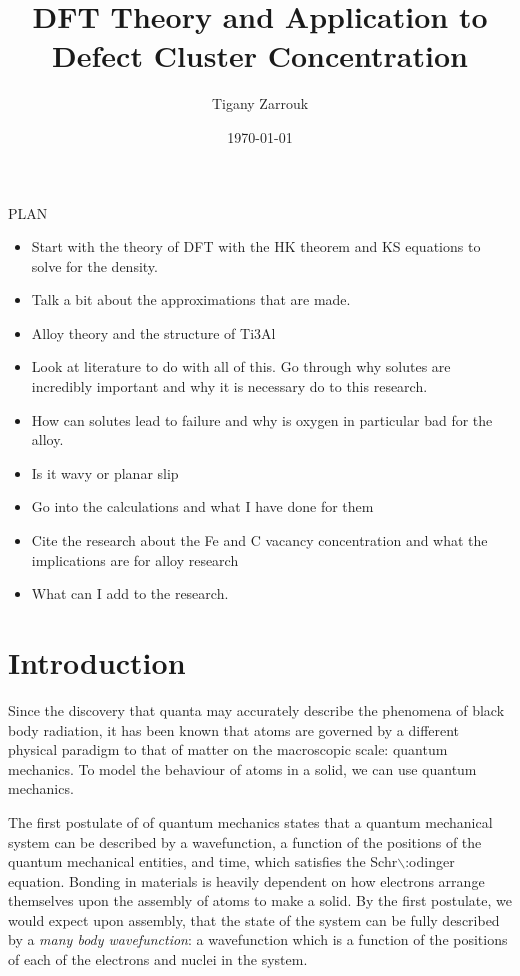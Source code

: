 \documentclass[11pt]{article}
\author{Tigany Zarrouk}
\date{\today}
\title{DFT Theory and Application to Defect Cluster Concentration}
\begin{document}
\maketitle
\tableofcontents

PLAN 

\begin{itemize}
\item Start with the theory of DFT with the HK theorem and KS equations to solve
for the density.
\item Talk a bit about the approximations that are made.
\item Alloy theory and the structure of Ti3Al
\item Look at literature to do with all of this. Go through why solutes are
incredibly important and why it is necessary do to this research.
\item How can solutes lead to failure and why is oxygen in particular bad for the alloy.
\item Is it wavy or planar slip
\item Go into the calculations and what I have done for them
\item Cite the research about the Fe and C vacancy concentration and what the
implications are for alloy research
\item What can I add to the research.
\end{itemize}

\section{Introduction}
\label{sec:org2541f29}

Since the discovery that quanta may accurately describe the phenomena of black body radiation,
it has been known that atoms are governed by a different physical paradigm to that of matter on
the macroscopic scale: quantum mechanics. To model the behaviour of atoms in a solid, we can
use quantum mechanics.

The first postulate of of quantum mechanics states that a quantum mechanical system can be
described by a wavefunction, a function of the positions of the quantum mechanical entities,
and time, which satisfies the Schr$\backslash$:odinger equation. Bonding in materials is heavily dependent
on how electrons arrange themselves upon the assembly of atoms to make a solid. By the first postulate, we
would expect upon assembly, that the state of the system can be fully described by a \emph{many body
wavefunction}: a wavefunction which is a function of the positions of each of the electrons and
nuclei in the system.
\end{document}
